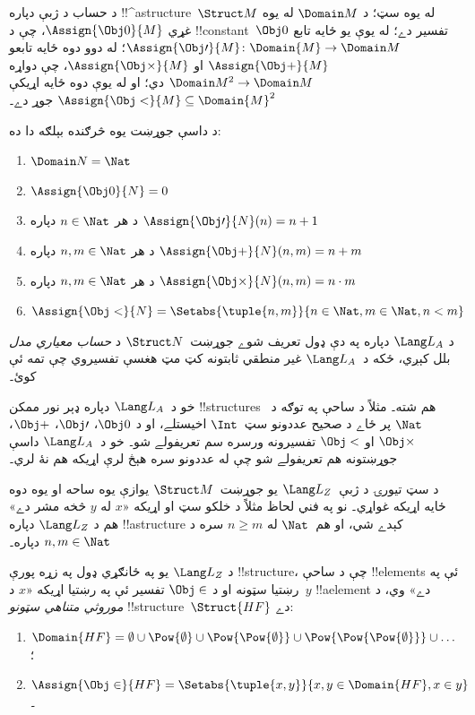 \documentclass[../../../include/open-logic-section]{subfiles}
\begin{document}
\begin{ex}
د حساب د ژبې دپاره !!^a{structure}~$\Struct M$ له يوه سټ؛ د
$\Domain M$ له يوه غړي $\Assign{\Obj 0}{M}$، چې د
!!{constant}~$\Obj 0$ تفسير دے؛ له يوې يو ځايه تابع
$\Assign{\Obj \prime}{M} \colon \Domain{M} \to \Domain M$؛ له دوو
دوه ځايه تابعو $\Assign{\Obj +}{M}$ او $\Assign{\Obj
  \times}{M}$، چې دواړه $\Domain M^2 \to \Domain M$ دي؛ او له يوې
دوه ځايه اړيکې $\Assign{\Obj <}{M} \subseteq \Domain{M}^2$ جوړ دے۔

د داسې جوړښت يوه څرګنده بېلګه دا ده:
\begin{enumerate}
\item $\Domain N = \Nat$
\item $\Assign{\Obj 0}{N} = 0$
\item د هر $n \in \Nat$ دپاره $\Assign{\Obj \prime}{N}(n) = n + 1$
\item د هر $n, m \in \Nat$ دپاره $\Assign{\Obj +}{N}(n, m) = n + m$
\item د هر $n, m \in \Nat$ دپاره $\Assign{\Obj \times}{N}(n, m) = n\cdot m$
\item $\Assign{\Obj <}{N} = \Setabs{\tuple{n, m}}{n \in \Nat, m \in
  \Nat, n < m}$
\end{enumerate}
د $\Lang L_A$ دپاره په دې ډول تعريف شوے جوړښت~$\Struct N$ د
\emph{حساب معياري مدل} بلل کېږي، ځکه د~$\Lang L_A$ غير منطقي ثابتونه
کټ مټ هغسې تفسيروي چې تمه ئې کوئ۔

خو د~$\Lang L_A$ دپاره ډېر نور ممکن !!{structure}s هم شته۔ مثلاً د
ساحې په توګه د~$\Nat$ پر ځاے د صحيح عددونو سټ~$\Int$ اخيستلے، او د
$\Obj 0$، $\Obj \prime$، $\Obj +$، $\Obj \times$ او $\Obj <$ تفسيرونه
ورسره سم تعريفولے شو۔ خو د~$\Lang L_A$ داسې جوړښتونه هم تعريفولے شو
چې له عددونو سره هېڅ لرې اړيکه هم نۀ لري۔
\end{ex}

\begin{ex}
د سټ تيورۍ د ژبې~$\Lang L_Z$ يو جوړښت~$\Struct M$ يوازې يوه ساحه
او يوه دوه ځايه اړيکه غواړي۔ نو په فني لحاظ مثلاً د خلکو سټ او اړيکه
«$x$ له $y$ څخه مشر دے» هم د $\Lang L_Z$ دپاره !!a{structure}
کېدے شي، او هم~$\Nat$ له $n \ge m$ سره د $n, m \in \Nat$ دپاره۔

د $\Lang L_Z$ يو په ځانګړي ډول په زړه پورې !!{structure}، چې د ساحې
!!{element}s ئې په رښتيا سټونه او د $\Obj \in$ تفسير ئې په رښتيا
اړيکه «$x$ د~$y$ !!a{element} دے» وي، د \emph{موروثي متناهي
سټونو} !!{structure}~$\Struct{{HF}}$ دے:
\begin{enumerate}
\item $\Domain{{{HF}}} = \emptyset \cup \Pow{\emptyset} \cup
  \Pow{\Pow{\emptyset}} \cup \Pow{\Pow{\Pow{\emptyset}}} \cup \dots$؛
\item $\Assign{\Obj \in}{{{HF}}} = \Setabs{\tuple{x, y}}{x, y \in
  \Domain{{{HF}}}, x \in y}$۔
\end{enumerate}
\end{ex}
\end{document}
